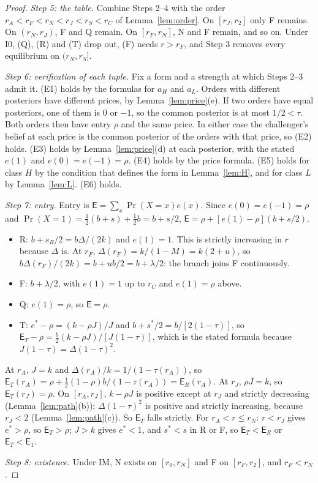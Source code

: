 \documentclass[11pt]{article}
\theoremstyle{definition}
\newcommand{\Ent}{\mathsf E}
\begin{document}
\begin{proof}
\emph{Step 5: the table.} Combine Steps 2--4 with the order $r_A<r_F<r_N<r_J<r_S<r_C$ of Lemma~\ref{lem:order}.
On $[r_J,r_2]$ only F remains. On $(r_N,r_J)$, F and Q remain. On $[r_F,r_N]$, N and F remain, and so on. Under I0,
(Q), (R) and (T) drop out, (F) needs $r>r_F$, and Step 3 removes every equilibrium on $(r_N,r_S]$.

\emph{Step 6: verification of each tuple.} Fix a form and a strength at which Steps 2--3 admit it.
(E1) holds by the formulas for $a_H$ and $a_L$. Orders with different posteriors have different prices, by
Lemma~\ref{lem:price}(e). If two orders have equal posteriors, one of them is $0$ or $-1$, so the common posterior
is at most $1/2<\tau$. Both orders then have entry $\rho$ and the same price. In either case the challenger's
belief at each price is the common posterior of the orders with that price, so (E2) holds. (E3) holds by
Lemma~\ref{lem:price}(d) at each posterior, with the stated $e(1)$ and $e(0)=e(-1)=\rho$. (E4) holds by the price
formula. (E5) holds for class $H$ by the condition that defines the form in Lemma~\ref{lem:H}, and for class $L$ by
Lemma~\ref{lem:L}. (E6) holds.

\emph{Step 7: entry.} Entry is $\Ent=\sum_x\Pr(X=x)e(x)$. Since $e(0)=e(-1)=\rho$ and
$\Pr(X=1)=\tfrac12(b+s)+\tfrac12b=b+s/2$, $\Ent=\rho+[e(1)-\rho](b+s/2)$.
\begin{itemize}
\item R: $b+s_R/2=b\Delta/(2k)$ and $e(1)=1$. This is strictly increasing in $r$ because $\Delta$ is. At $r_F$,
  $\Delta(r_F)=k/(1-M)=k(2+u)$, so $b\Delta(r_F)/(2k)=b+ub/2=b+\lambda/2$: the branch joins F continuously.
\item F: $b+\lambda/2$, with $e(1)=1$ up to $r_C$ and $e(1)=\rho$ above.
\item Q: $e(1)=\rho$, so $\Ent=\rho$.
\item T: $e^*-\rho=(k-\rho J)/J$ and $b+s^*/2=b/[2(1-\tau)]$, so $\Ent_T-\rho=\tfrac b2(k-\rho J)/[J(1-\tau)]$,
  which is the stated formula because $J(1-\tau)=\Delta(1-\tau)^2$.
\end{itemize}
At $r_A$, $J=k$ and $\Delta(r_A)/k=1/(1-\tau(r_A))$, so $\Ent_T(r_A)=\rho+\tfrac12(1-\rho)b/(1-\tau(r_A))=\Ent_R(r_A)$.
At $r_J$, $\rho J=k$, so $\Ent_T(r_J)=\rho$. On $[r_A,r_J]$, $k-\rho J$ is positive except at $r_J$ and strictly
decreasing (Lemma~\ref{lem:path}(b)); $\Delta(1-\tau)^2$ is positive and strictly increasing, because $r_J<2$
(Lemma~\ref{lem:path}(c)). So $\Ent_T$ falls strictly. For $r_A<r\le r_N$: $r<r_J$ gives $e^*>\rho$, so
$\Ent_T>\rho$; $J>k$ gives $e^*<1$, and $s^*<s$ in R or F, so $\Ent_T<\Ent_R$ or $\Ent_T<\Ent_1$.

\emph{Step 8: existence.} Under IM, N exists on $[r_0,r_N]$ and F on $[r_F,r_2]$, and $r_F<r_N$.
\end{proof}
\end{document}
